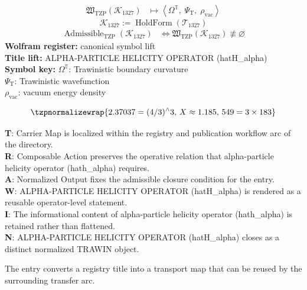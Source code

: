 \noindent
\begin{minipage}[t]{0.48\linewidth}
\begingroup
\small
\[
\begin{aligned}
\mathfrak{W}_{\mathrm{TZP}}\!\left(\mathcal{K}_{1327}\right)
&\longmapsto
\left\langle \Omega^{\mathbb{T}},\; \Psi_{\mathrm{T}},\; \rho_{\mathrm{vac}} \right\rangle
\end{aligned}
\]
\[
\mathcal{K}_{1327}
:=
\operatorname{HoldForm}\!\left(\mathcal{T}_{1327}\right)
\]
\[
\begin{aligned}
\operatorname{Admissible}_{\mathrm{TZP}}\!\left(\mathcal{K}_{1327}\right)
&\Longleftrightarrow
\mathfrak{W}_{\mathrm{TZP}}\!\left(\mathcal{K}_{1327}\right)\not\equiv\varnothing
\end{aligned}
\]
\textbf{Wolfram register:} canonical symbol lift\\
\textbf{Title lift:} ALPHA-PARTICLE HELICITY OPERATOR (hatH\_alpha)\\
\textbf{Symbol key:} \(\Omega^{\mathbb{T}}\): Trawinistic boundary curvature\\ \(\Psi_{\mathrm{T}}\): Trawinistic wavefunction\\ \(\rho_{\mathrm{vac}}\): vacuum energy density
\par
\endgroup
\end{minipage}\hfill
\begin{minipage}[t]{0.48\linewidth}
\[
\tzpnormalizewrap{2.37037=(4/3)^{\wedge}3,\,X\approx1.185,\,549=3\times183}
\]

\small
\textbf{T}: Carrier Map is localized within the registry and publication workflow arc of the directory.\\
\textbf{R}: Composable Action preserves the operative relation that alpha-particle helicity operator (hath\_alpha) requires.\\
\textbf{A}: Normalized Output fixes the admissible closure condition for the entry.\\
\textbf{W}: ALPHA-PARTICLE HELICITY OPERATOR (hatH\_alpha) is rendered as a reusable operator-level statement.\\
\textbf{I}: The informational content of alpha-particle helicity operator (hath\_alpha) is retained rather than flattened.\\
\textbf{N}: ALPHA-PARTICLE HELICITY OPERATOR (hatH\_alpha) closes as a distinct normalized TRAWIN object.
\normalsize
\end{minipage}

The entry converts a registry title into a transport map that can be reused by the surrounding transfer arc.
\clearpage

